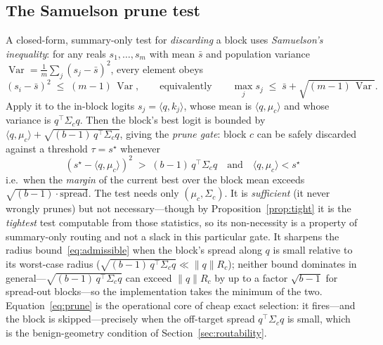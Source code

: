 \documentclass[11pt]{article}
\numberwithin{equation}{section}
\newcommand{\Var}{\operatorname{Var}}
\newcommand{\inner}[2]{\langle #1, #2\rangle}
\begin{document}
\subsection{The Samuelson prune test}\label{sec:prune}

A closed-form, summary-only test for \emph{discarding} a block uses \emph{Samuelson's inequality}: for any
reals $s_1,\dots,s_m$ with mean $\bar s$ and population variance $\Var=\frac1m\sum_j(s_j-\bar s)^2$, every
element obeys
\begin{equation}\label{eq:samuelson}
(s_i-\bar s)^2 \;\le\; (m-1)\,\Var, \qquad\text{equivalently}\qquad
\max_j s_j \;\le\; \bar s + \sqrt{(m-1)\,\Var}.
\end{equation}
Apply it to the in-block logits $s_j=\inner{q}{k_j}$, whose mean is $\inner{q}{\mu_c}$ and whose variance is
$q^\top\Sigma_c q$. Then the block's best logit is bounded by $\inner{q}{\mu_c}+\sqrt{(b-1)\,q^\top\Sigma_c
q}$, giving the \emph{prune gate}: block $c$ can be safely discarded against a threshold $\tau=s^\star$ whenever
\begin{equation}\label{eq:prune}
\boxed{\;(s^\star-\inner{q}{\mu_c})^2 \;>\; (b-1)\,q^\top\Sigma_c q\quad\text{and}\quad \inner{q}{\mu_c}<s^\star\;}
\end{equation}
i.e.\ when the \emph{margin} of the current best over the block mean exceeds $\sqrt{(b-1)\cdot\text{spread}}$.
The test needs only $(\mu_c,\Sigma_c)$. It is \emph{sufficient} (it never wrongly prunes) but not necessary---though by Proposition~\ref{prop:tight} it is the \emph{tightest} test computable from those statistics, so its non-necessity is a property of summary-only routing and not a slack in this particular gate.
It sharpens the radius bound~\eqref{eq:admissible} when the block's spread along $q$ is small relative to its
worst-case radius ($\sqrt{(b-1)\,q^\top\Sigma_c q}\ll\lVert q\rVert R_c$); neither bound dominates in
general---$\sqrt{(b-1)\,q^\top\Sigma_c q}$ can exceed $\lVert q\rVert R_c$ by up to a factor $\sqrt{b-1}$ for
spread-out blocks---so the implementation takes the minimum of the two.
Equation~\eqref{eq:prune} is the operational core of cheap exact selection: it fires---and the block is
skipped---precisely when the off-target spread $q^\top\Sigma_c q$ is small, which is the benign-geometry
condition of Section~\ref{sec:routability}.
\end{document}
